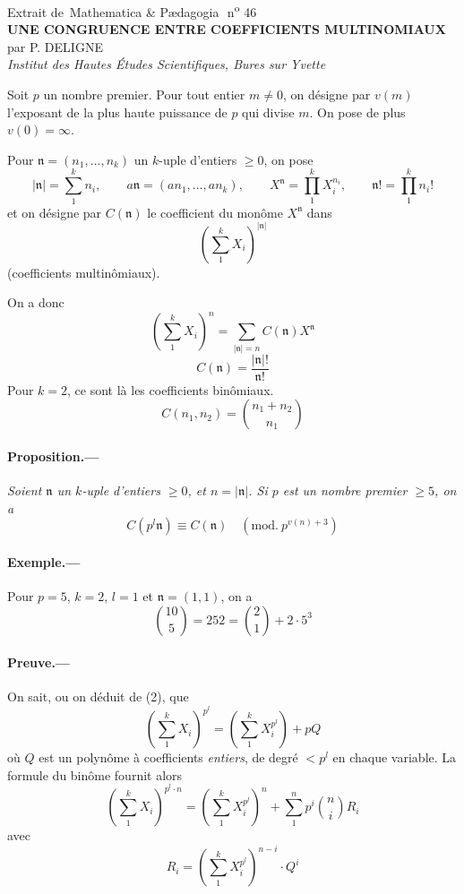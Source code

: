 \documentclass[10pt]{article}
\newcommand{\og}{\guillemotleft\,}
\newcommand{\fg}{\,\guillemotright}
\newcommand{\nn}{\mathfrak n}
\begin{document}
\begin{center}
{\large Extrait de \og Mathematica \& Pædagogia\fg\ n\textsuperscript{o} 46}\\[2.4em]
{\Large\bfseries UNE CONGRUENCE ENTRE COEFFICIENTS MULTINOMIAUX}\\[1.0em]
par P. DELIGNE\\
{\itshape Institut des Hautes Études Scientifiques, Bures sur Yvette}
\end{center}

\medskip

Soit $p$ un nombre premier. Pour tout entier $m\ne0$, on désigne par $v(m)$ l'exposant de la plus haute puissance de $p$ qui divise $m$. On pose de plus $v(0)=\infty$.

Pour $\nn=(n_1,\ldots,n_k)$ un $k$-uple d'entiers $\ge0$, on pose
\[
|\nn|=\sum_1^k n_i,\qquad
a\nn=(an_1,\ldots,an_k),\qquad
X^\nn=\prod_1^k X_i^{n_i},\qquad
\nn! = \prod_1^k n_i!
\]
et on désigne par $C(\nn)$ le coefficient du monôme $X^\nn$ dans
\[
\left(\sum_1^k X_i\right)^{|\nn|}
\]
(coefficients multinômiaux).

On a donc
\[
\left(\sum_1^k X_i\right)^n
=\sum_{|\nn|=n} C(\nn)X^\nn \tag{1}
\]
\[
C(\nn)=\frac{|\nn|!}{\nn!} \tag{2}
\]
Pour $k=2$, ce sont là les coefficients binômiaux.
\[
C(n_1,n_2)=\binom{n_1+n_2}{n_1} \tag{3}
\]

\paragraph{Proposition.---} \emph{Soient $\nn$ un $k$-uple d'entiers $\ge0$, et $n=|\nn|$. Si $p$ est un nombre premier $\ge5$, on a}
\[
C(p^l\nn)\equiv C(\nn)\quad(\mathrm{mod.}\ p^{v(n)+3}) \tag{4}
\]

\paragraph{Exemple.---} Pour $p=5$, $k=2$, $l=1$ et $\nn=(1,1)$, on a
\[
\binom{10}{5}=252=\binom21+2\cdot5^3
\]

\paragraph{Preuve.---} On sait, ou on déduit de (2), que
\[
\left(\sum_{1}^k X_i\right)^{p^l}
=
\left(\sum_{1}^k X_i^{p^l}\right)+pQ \tag{5}
\]
où $Q$ est un polynôme à coefficients \emph{entiers}, de degré $<p^l$ en chaque variable. La formule du binôme fournit alors
\[
\left(\sum_{1}^k X_i\right)^{p^l\cdot n}
=
\left(\sum_{1}^k X_i^{p^l}\right)^n
+\sum_{1}^n p^i\binom ni R_i \tag{6}
\]
avec
\[
R_i=
\left(\sum_{1}^k X_i^{p^l}\right)^{n-i}\cdot Q^i \tag{7}
\]
\end{document}
